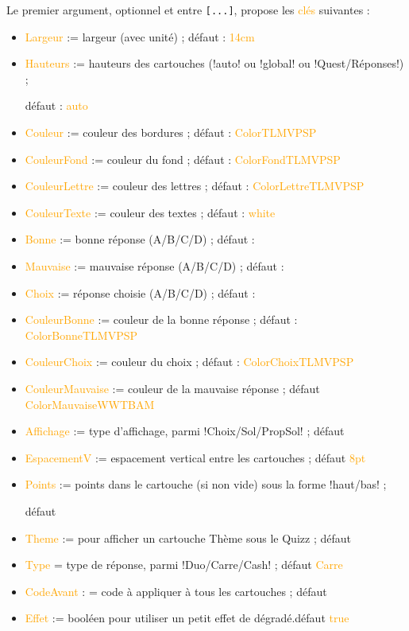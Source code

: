 \documentclass[french,a4paper,11pt]{article}
\newcommand\Cle[1]{{\small\sffamily\textlangle \textcolor{orange}{#1}\textrangle}}
\newcommand\cmaj[1]{\tcbox[vignetteMaJ]{#1}\xspace}
\begin{document}
\begin{tipblock}
Le premier argument, optionnel et entre \texttt{[...]}, propose les \Cle{clés} suivantes :

\begin{itemize}
	\item \Cle{Largeur} := largeur (avec unité) ; \hfill{}défaut : \Cle{14cm}
%	
	\item \Cle{Hauteurs} := hauteurs des cartouches (\motcletex!auto! ou \motcletex!global! ou \motcletex!Quest/Réponses!) ;
	
	\hfill{}défaut : \Cle{auto}
	\item \Cle{Couleur} := couleur des bordures ; \hfill{}défaut : \Cle{ColorTLMVPSP}
	\item \Cle{CouleurFond} := couleur du fond ; \hfill{}défaut : \Cle{ColorFondTLMVPSP}
	\item \Cle{CouleurLettre} := couleur des lettres ; \hfill{}défaut : \Cle{ColorLettreTLMVPSP}
	\item \Cle{CouleurTexte} := couleur des textes ; \hfill{}défaut : \Cle{white}
	\item \Cle{Bonne} := bonne réponse (A/B/C/D) ; \hfill{}défaut : \Cle{}
	\item \Cle{Mauvaise} := mauvaise réponse (A/B/C/D) ; \hfill{}défaut : \Cle{}
	\item \Cle{Choix} := réponse choisie (A/B/C/D) ; \hfill{}défaut : \Cle{}
	\item \Cle{CouleurBonne} := couleur de la bonne réponse ; \hfill{}défaut : \Cle{ColorBonneTLMVPSP}
	\item \Cle{CouleurChoix} := couleur du choix ; \hfill{}défaut : \Cle{ColorChoixTLMVPSP}
	\item \Cle{CouleurMauvaise} := couleur de la mauvaise réponse ; \hfill{}défaut \Cle{ColorMauvaiseWWTBAM}
	\item \Cle{Affichage} := type d'affichage, parmi \motcletex!Choix/Sol/PropSol! ; \hfill{}défaut \Cle{}
	\item \Cle{EspacementV} := espacement vertical entre les cartouches ; \hfill{}défaut \Cle{8pt}
	\item \cmaj{0.1.1} \Cle{Points} := points dans le cartouche (si non vide) sous la forme \motcletex!haut/bas! ;
	
	\hfill{}défaut \Cle{}
	\item \Cle{Theme} := pour afficher un cartouche \textsf{Thème} sous le Quizz ; \hfill{}défaut \Cle{}
	\item \Cle{Type} = type de réponse, parmi \motcletex!Duo/Carre/Cash! ; \hfill{}défaut \Cle{Carre}
	\item \cmaj{0.1.1} \Cle{CodeAvant} : = code à appliquer à tous les cartouches ; \hfill{}défaut \Cle{}
	\item \Cle{Effet} := booléen pour utiliser un petit effet de dégradé.\hfill{}défaut \Cle{true}
\end{itemize}
\vspace*{-\baselineskip}\leavevmode
\end{tipblock}
\end{document}
